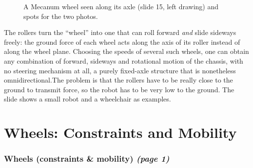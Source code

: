 \documentclass[11pt,a4paper]{article}
\theoremstyle{definition}
\theoremstyle{plain}
\begin{document}
\begin{figure}[H]
\centering
{}
\caption{A Mecanum wheel seen along its axle (slide 15, left drawing) and spots for the two photos.}
\end{figure}

\begin{intuition}
The rollers turn the ``wheel'' into one that can roll forward \emph{and} slide sideways freely: the ground force of each wheel acts along the axis of its roller instead of along the wheel plane. Choosing the speeds of several such wheels, one can obtain any combination of forward, sideways and rotational motion of the chassis, with no steering mechanism at all, a purely fixed-axle structure that is nonetheless omnidirectional.The problem is that the rollers have to be really close to the ground to transmit force, so the robot has to be very low to the ground. The slide shows a small robot and a wheelchair as examples.
\end{intuition}

\part{Wheels: Constraints and Mobility}
 
\section{Wheels (constraints \& mobility) \emph{(page 1)}}
 
\end{document}
